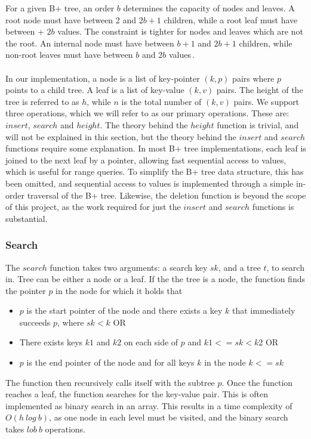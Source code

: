 For a given B+ tree, an order $b$ determines the capacity of nodes and leaves. A root node must have between 2 and $2b+1$ children, while a root leaf must have between + $2b$ values. The constraint is tighter for nodes and leaves which are not the root. An internal node must have between $b+1$ and $2b+1$ children, while non-root leaves must have between $b$ and $2b$ values\,\cite[p. 335]{ramakrishnan2003database}. 

\paragraph{}
In our implementation, a node is a list of key-pointer $(k, p)$ pairs where $p$ points to a child tree. A leaf is a list of key-value $(k, v)$ pairs. The height of the tree is referred to as $h$, while $n$ is the total number of $(k, v)$ pairs. We support three operations, which we will refer to as our primary operations. These are: $insert$, $search$ and $height$. The theory behind the $height$ function is trivial, and will not be explained in this section, but the theory behind the $insert$ and $search$ functions require some explanation. In most B+ tree implementations, each leaf is joined to the next leaf by a pointer, allowing fast sequential access to values, which is useful for range queries. To simplify the B+ tree data structure, this has been omitted, and sequential access to values is implemented through a simple in-order traversal of the B+ tree. Likewise, the deletion function is beyond the scope of this project, as the work required for just the $insert$ and $search$ functions is substantial.

\subsubsection{Search}
\label{subsec:Search}
The $search$ function takes two arguments: a search key $sk$, and a tree $t$, to search in. Tree can be either a node or a leaf. If the the tree is a node, the function finds the pointer $p$ in the node for which it holds that
\begin{itemize}
	\item $p$ is the start pointer of the node and there exists a key $k$ that immediately succeeds $p$, where $sk < k$ OR
	\item There exists keys $k1$ and $k2$ on each side of $p$ and $k1 <= sk < k2$ OR
	\item $p$ is the end pointer of the node and for all keys $k$ in the node $k <= sk$
\end{itemize}
The function then recursively calls itself with the subtree $p$. Once the function reaches a leaf, the function searches for the key-value pair. This is often implemented as binary search in an array. This results in a time complexity of $O(h~log~b)$, as one node in each level must be visited, and the binary search takes $lob~b$ operations.

